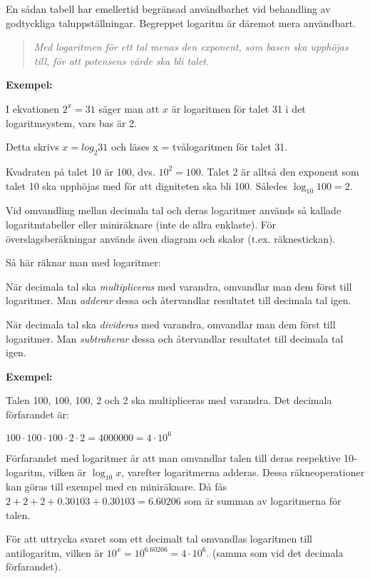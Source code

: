 En sådan tabell har emellertid begränsad användbarhet vid behandling av
godtyckliga taluppställningar. Begreppet logaritm är däremot mera användbart.

\begin{quote}\emph{
Med logaritmen för ett tal menas den exponent, som basen ska upphöjas till,
för att potensens värde ska bli talet.
}\end{quote}

\textbf{Exempel:}

I ekvationen \(2^x = 31\) säger man att \(x\) är logaritmen för talet 31 i det
logaritmsystem, vars bas är 2.

Detta skrivs \(x= log_2 31\) och läses x = tvålogaritmen för talet 31.

Kvadraten på talet 10 är 100, dvs. \(10^2 = 100\).
Talet 2 är alltså den exponent som talet 10 ska upphöjas med för att digniteten
ska bli 100.
Således \(\log_{10}{100} = 2\).

Vid omvandling mellan decimala tal och deras logaritmer används så kallade
logaritmtabeller eller miniräknare (inte de allra enklaste).
För överslagsberäkningar används även diagram och skalor (t.ex. räknestickan).

Så här räknar man med logaritmer:

När decimala tal ska \emph{multipliceras} med varandra, omvandlar man dem
först till logaritmer.
Man \emph{adderar} dessa och återvandlar resultatet till decimala tal igen.

När decimala tal ska \emph{divideras} med varandra, omvandlar man dem först
till logaritmer.
Man \emph{subtraherar} dessa och återvandlar resultatet till decimala tal igen.

\textbf{Exempel:}

Talen 100, 100, 100, 2 och 2 ska multipliceras med varandra.
Det decimala förfarandet är:

\(100 \cdot 100 \cdot 100 \cdot 2 \cdot 2 = 4000000 = 4 \cdot 10^6\)

Förfarandet med logaritmer är att man omvandlar talen till deras respektive
10-logaritm, vilken är \(\log_{10} x\), varefter logaritmerna adderas.
Dessa räkneoperationer kan göras till exempel med en miniräknare.
Då fås \(2 + 2 + 2 + 0.30103 + 0.30103 = 6.60206\) som är summan av
logaritmerna för talen.

För att uttrycka svaret som ett decimalt tal omvandlas logaritmen till
antilogaritm, vilken är \(10^x = 10^{6.60206} = 4 \cdot 10^6\).
(samma som vid det decimala förfarandet).

